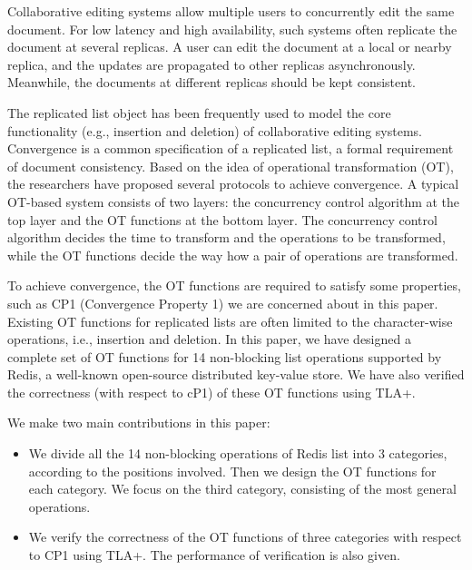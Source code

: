 \begin{englishabstract}
Collaborative editing systems allow multiple users to concurrently edit the same document.
For low latency and high availability, such systems often replicate the document at several replicas.
A user can edit the document at a local or nearby replica, 
and the updates are propagated to other replicas asynchronously.
Meanwhile, the documents at different replicas should be kept consistent. 

The replicated list object has been frequently used to model the core functionality 
(e.g., insertion and deletion) of collaborative editing systems.
Convergence is a common specification of a replicated list, a formal requirement of document consistency.
Based on the idea of operational transformation (OT), 
the researchers have proposed several protocols to achieve convergence.
A typical OT-based system consists of two layers: 
the concurrency control algorithm at the top layer and the OT functions at the bottom layer.
The concurrency control algorithm decides the time to transform and the operations to be transformed,
while the OT functions decide the way how a pair of operations are transformed.

To achieve convergence, the OT functions are required to satisfy some properties, 
such as CP1 (Convergence Property 1) we are concerned about in this paper.
Existing OT functions for replicated lists are often limited to the character-wise operations, 
i.e., insertion and deletion.
In this paper, we have designed a complete set of OT functions for 14 non-blocking list operations supported by Redis, 
a well-known open-source distributed key-value store.
We have also verified the correctness (with respect to cP1) of these OT functions using TLA+.

We make two main contributions in this paper:
\begin{itemize}
  \item We divide all the 14 non-blocking operations of Redis list into 3 categories, 
    according to the positions involved. 
    Then we design the OT functions for each category.
    We focus on the third category, consisting of the most general operations.
  \item 
    We verify the correctness of the OT functions of three categories with respect to CP1
    using TLA+.
    The performance of verification is also given.
\end{itemize}

\end{englishabstract}